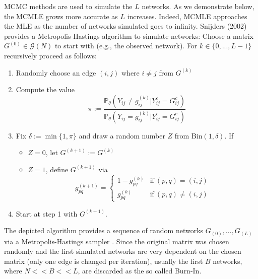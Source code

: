 \documentclass[10pt, conference, compsocconf]{IEEEtran}
\begin{document}
MCMC methods are used to simulate the $L$ networks. As we demonstrate below, the MCMLE grows more accurate as $L$ increases. Indeed, MCMLE approaches the MLE as the number of networks simulated goes to infinity. Snijders (2002) \cite{Snijders.2002} provides a Metropolis Hastings algorithm to simulate networks:
Choose a matrix $G^{(0)} \in \mathcal{G}(N)$ to start with (e.g., the observed network). For $k \in \{0,...,L-1\}$ recursively proceed as follows:\\
\begin{enumerate}
\item Randomly choose an edge $(i,j)$ where $i \neq j$ from $G^{(k)}$
\item Compute the value
$$\pi := \dfrac{\mathbb{P}_{\theta}(Y_{ij} \neq g_{ij}^{(k)} | Y_{ij}^c=G_{ij}^c)}{\mathbb{P}_{\theta}(Y_{ij}= g_{ij}^{(k)} | Y_{ij}^c=G_{ij}^c)}$$
\item Fix $\delta:= \min\{1, \pi\}$ and draw a random number $Z$ from Bin$(1, \delta)$. If
\begin{itemize}
\item $Z=0$, let $G^{(k+1)} := G^{(k)}$ 
\item $Z=1$, define $G^{(k+1)}$ via
$$g_{pq}^{(k+1)}=\begin{cases}
1-g_{pq}^{(k)}& \text{if}~ (p,q)=(i,j) \\
g_{pq}^{(k)} &\text{if}~ (p,q) \neq (i,j) 
\end{cases}$$
\end{itemize}
\item Start at step 1 with $G^{(k+1)}$.
\end{enumerate}
\vspace{0.3cm}
\noindent The depicted algorithm provides a sequence of random networks $G_(0),\dots,G_(L)$ via a Metropolis-Hastings sampler \cite{chib1995understanding}. Since the original matrix was chosen randomly and the first simulated networks are very dependent on the chosen matrix (only one edge is changed per iteration), usually
the first $B$ networks, where $N << B << L$, are discarded as the so called Burn-In.
\end{document}
